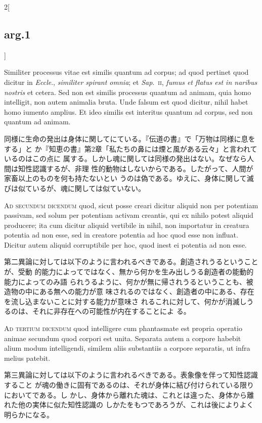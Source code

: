 \documentclass[paper=a4paper,fontsize=10pt,jafontsize=9pt,titlepage]{jlreq}
\begin{document}
\begin{paracol}{2}[\subsection{arg.1}]
\switchcolumn*


Similiter processus vitae est similis quantum ad corpus; ad quod pertinet quod
dicitur in {\itshape Eccle}., {\itshape similiter spirant omnia}; et {\itshape
Sap}.~{\scshape ii}, {\itshape fumus et flatus est in naribus nostris} et
cetera. Sed non est similis processus quantum ad animam, quia homo intelligit,
non autem animalia bruta. Unde falsum est quod dicitur, nihil habet homo iumento
amplius. Et ideo similis est interitus quantum ad corpus, sed non quantum ad
animam.


\switchcolumn

同様に生命の発出は身体に関してにている。『伝道の書』で「万物は同様に息をする」と
 か『知恵の書』第2章「私たちの鼻には煙と風がある云々」と言われているのはこの点に
 属する。しかし魂に関しては同様の発出はない。なぜなら人間は知性認識するが、非理
 性的動物はしないからである。したがって、人間が家畜以上のものを何も持たないとい
 うのは偽である。ゆえに、身体に関して滅びは似ているが、魂に関しては似ていない。


\switchcolumn*[\subsection{ad 2}]

{\scshape Ad secundum dicendum} quod, sicut posse creari dicitur aliquid non per
potentiam passivam, sed solum per potentiam activam creantis, qui ex nihilo
potest aliquid producere; ita cum dicitur aliquid vertibile in nihil, non
importatur in creatura potentia ad non esse, sed in creatore potentia ad hoc
quod esse non influat. Dicitur autem aliquid corruptibile per hoc, quod inest ei
potentia ad non esse.

\switchcolumn

第二異論に対しては以下のように言われるべきである。創造されうるということが、受動
的能力によってではなく、無から何かを生み出しうる創造者の能動的能力によってのみ語
られうるように、何かが無に帰されうるということも、被造物の中にある無への能力が意
味されるのではなく、創造者の中にある、存在を流し込まないことに対する能力が意味さ
れるこれに対して、何かが消滅しうるのは、それに非存在への可能性が内在することによ
る。

\switchcolumn*[\subsection{ad 3}]

{\scshape Ad tertium dicendum} quod intelligere cum phantasmate est propria
operatio animae secundum quod corpori est unita. Separata autem a corpore
habebit alium modum intelligendi, similem aliis substantiis a corpore separatis,
ut infra melius patebit.

\switchcolumn

第三異論に対しては以下のように言われるべきである。表象像を伴って知性認識すること
が魂の働きに固有であるのは、それが身体に結び付けられている限りにおいてである。し
かし、身体から離れた魂は、これとは違った、身体から離れた他の実体に似た知性認識の
しかたをもつであろうが、これは後によりよく明らかになる。

\end{paracol}
\newpage
\end{document}
